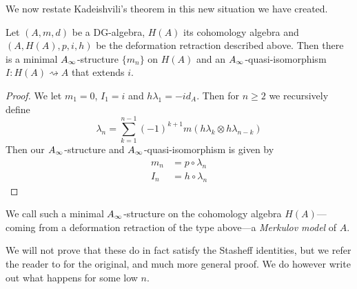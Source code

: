 We now restate Kadeishvili's theorem in this new situation we have created.

\begin{theorem}
\label{thm:Kadeishvilis_theorem2}
Let $(A, m, d)$ be a DG-algebra, $H(A)$ its cohomology algebra and $(A, H(A), p, i, h)$ be the deformation retraction described above. Then there is a minimal $A_{\infty}$-structure $\{m_n\}$ on $H(A)$ and an $A_{\infty}$-quasi-isomorphism $I\colon H(A)\rightsquigarrow A$ that extends $i$. 
\end{theorem}
\begin{proof}
We let $m_1=0$, $I_1=i$ and $h\lambda_1 = -id_A$. Then for $n\geq 2$ we recursively define
\begin{equation*}
    \lambda_n = \sum_{k=1}^{n-1}(-1)^{k+1}m(h\lambda_k\otimes h\lambda_{n-k})
\end{equation*}
Then our $A_{\infty}$-structure and $A_{\infty}$-quasi-isomorphism is given by 
\begin{align*}
    m_n &= p\circ \lambda_n \\
    I_n &= h\circ \lambda_n
\end{align*}
\end{proof}

We call such a minimal $A_{\infty}$-structure on the cohomology algebra $H(A)$---coming from a deformation retraction of the type above---a \emph{Merkulov model} of $A$. 

We will not prove that these do in fact satisfy the Stasheff identities, but we refer the reader to \cite{kadeishvili} for the original, and much more general proof. We do however write out what happens for some low $n$. 




